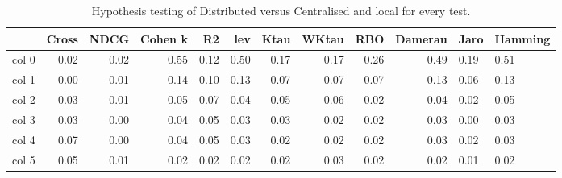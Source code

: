 \begin{table}[h]
\centering
\caption{Hypothesis testing of Distributed versus Centralised and local for every test.}
\label{tab:hyp}
\begin{tabular}{l|r|r|r|r|r|r|r|r|r}
\toprule
 & Cross & NDCG & Cohen k & R2 & lev & Ktau & WKtau & RBO & Damerau & Jaro & Hamming \\
\midrule
col 0 & 0.02 & {} 0.02 & {} 0.55 & 0.12 & 0.50 & 0.17 & 0.17 & 0.26 & 0.49 & 0.19 & 0.51 \\
col 1 & {} 0.00 & 0.01 & {} 0.14 & 0.10 & 0.13 & 0.07 & 0.07 & 0.07 & 0.13 & 0.06 & 0.13 \\
col 2 & 0.03 & {} 0.01 & 0.05 & {} 0.07 & 0.04 & 0.05 & 0.06 & 0.02 & 0.04 & 0.02 & 0.05 \\
col 3 & 0.03 & {} 0.00 & 0.04 & {} 0.05 & 0.03 & 0.03 & 0.02 & 0.02 & 0.03 & 0.00 & 0.03 \\
col 4 & {} 0.07 & {} 0.00 & 0.04 & 0.05 & 0.03 & 0.02 & 0.02 & 0.02 & 0.03 & 0.02 & 0.03 \\
col 5 & {} 0.05 & {} 0.01 & 0.02 & 0.02 & 0.02 & 0.02 & 0.03 & 0.02 & 0.02 & 0.01 & 0.02 \\
\bottomrule
\end{tabular}
\end{table}
